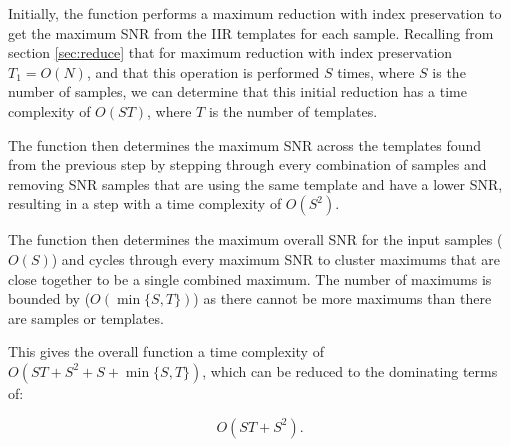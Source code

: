\documentclass{article}
\begin{document}
Initially, the function performs a maximum reduction with index preservation to get the maximum SNR from the IIR templates for each sample.
Recalling from section \ref{sec:reduce} that for maximum reduction with index preservation \(T_1 = O(N)\), and that this operation is performed \(S\) times, where \(S\) is the number of samples, we can determine that this initial reduction has a time complexity of 
\(O(ST)\), where \(T\) is the number of templates.

The function then determines the maximum SNR across the templates found from the previous step by stepping through every combination of samples and removing SNR samples that are using the same template and have a lower SNR, resulting in a step with a time complexity of \(O(S^2)\).

The function then determines the maximum overall SNR for the input samples (\(O(S)\)) and cycles through every maximum SNR to cluster maximums that are close together to be a single combined maximum.
The number of maximums is bounded by (\(O(\min\{S,T\})\)) as there cannot be more maximums than there are samples or templates.

This gives the overall function a time complexity of \(O(ST + S^2 + S + \min\{S,T\})\), which can be reduced to the dominating terms of:

\[
    O(ST + S^2).
\]


\printbibliography[
    heading=bibintoc,
    title={Bibliography}
]{}
\end{document}

